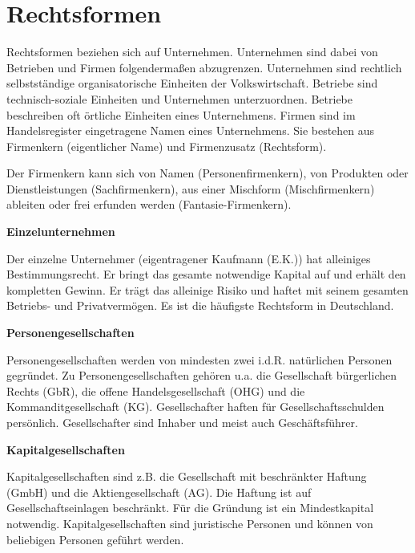 \section{Rechtsformen}

Rechtsformen beziehen sich auf Unternehmen. Unternehmen sind dabei von Betrieben und Firmen folgendermaßen abzugrenzen. Unternehmen sind rechtlich selbstständige organisatorische Einheiten der Volkswirtschaft. Betriebe sind technisch-soziale Einheiten und Unternehmen unterzuordnen. Betriebe beschreiben oft örtliche Einheiten eines Unternehmens. Firmen sind im Handelsregister eingetragene Namen eines Unternehmens. Sie bestehen aus Firmenkern (eigentlicher Name) und Firmenzusatz (Rechtsform).

Der Firmenkern kann sich von Namen (Personenfirmenkern), von Produkten oder Dienstleistungen (Sachfirmenkern), aus einer Mischform (Mischfirmenkern) ableiten oder frei erfunden werden (Fantasie-Firmenkern).

\textbf{Einzelunternehmen}

Der einzelne Unternehmer (eigentragener Kaufmann (E.K.)) hat alleiniges Bestimmungsrecht. Er bringt das gesamte notwendige Kapital auf und erhält den kompletten Gewinn. Er trägt das alleinige Risiko und haftet mit seinem gesamten Betriebs- und Privatvermögen. Es ist die häufigste Rechtsform in Deutschland.

\textbf{Personengesellschaften}

Personengesellschaften werden von mindesten zwei i.d.R. natürlichen Personen gegründet. Zu Personengesellschaften gehören u.a. die Gesellschaft bürgerlichen Rechts (GbR), die offene Handelsgesellschaft (OHG) und die Kommanditgesellschaft (KG). Gesellschafter haften für Gesellschaftsschulden persönlich. Gesellschafter sind Inhaber und meist auch Geschäftsführer.

\textbf{Kapitalgesellschaften}

Kapitalgesellschaften sind z.B. die Gesellschaft mit beschränkter Haftung (GmbH) und die Aktiengesellschaft (AG). Die Haftung ist auf Gesellschaftseinlagen beschränkt. Für die Gründung ist ein Mindestkapital notwendig. Kapitalgesellschaften sind juristische Personen und können von beliebigen Personen geführt werden.

